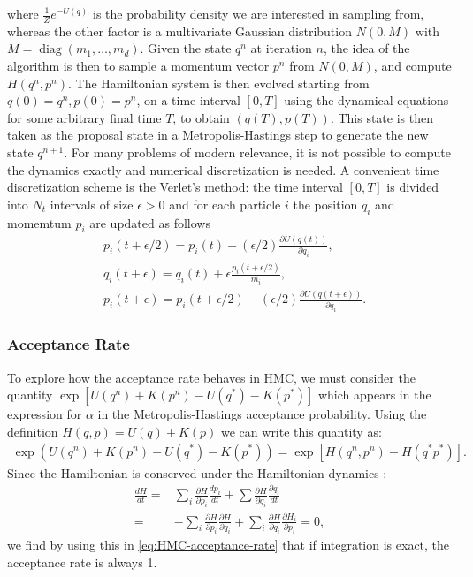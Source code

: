\documentclass[a4paper, 12pt,oneside]{article}
\begin{document}
			where $\frac{1}{Z} e^{-U(q)}$ is the probability density we are interested in sampling from, whereas the other factor is a multivariate Gaussian distribution $N(0, M)$ with $M=\operatorname{diag}\left(m_1, \ldots, m_d\right)$. Given the state $q^n$ at iteration $n$, the idea of the algorithm is then to sample a momentum vector $p^n$ from $N(0, M)$, and compute $H\left(q^n, p^n\right)$. The Hamiltonian system is then evolved starting from $q(0)=q^n, p(0)=p^n$, on a time interval $[0,T]$ using the dynamical equations for some arbitrary final time $T$, to obtain $(q(T), p(T))$. This state is then taken as the proposal state in a Metropolis-Hastings step to generate the new state $q^{n+1}$. For many problems of modern relevance, it is not possible to compute the dynamics exactly and numerical discretization is needed. A convenient time discretization scheme is the Verlet's method: the time interval $[0, T]$ is divided into $N_t$ intervals of size $\epsilon>0$ and for each particle $i$ the position $q_i$ and momemtum $p_i$ are updated as follows			
			\begin{align}
			& p_i(t+\epsilon / 2)=p_i(t)-(\epsilon / 2) \frac{\partial U(q(t))}{\partial q_i}, \\
			& q_i(t+\epsilon)=q_i(t)+\epsilon \frac{p_i(t+\epsilon / 2)}{m_i}, \\
			& p_i(t+\epsilon)=p_i(t+\epsilon / 2)-(\epsilon / 2) \frac{\partial U(q(t+\epsilon))}{\partial q_i}.
			\end{align}	
			\subsubsection{Acceptance Rate}
			To explore how the acceptance rate behaves in HMC, we must consider the quantity \newline $\exp \left[U\left(q^n\right)+K\left(p^n\right)-U\left(q^*\right)-K\left(p^*\right)\right]$ which appears in the expression for $\alpha$ in the Metropolis-Hastings acceptance probability. Using the definition $H(q, p)=U(q)+K(p)$ we can write this quantity as:
			\begin{gather}
				\exp \left(U\left(q^n\right)+K\left(p^n\right)-U\left(q^*\right)-K\left(p^*\right)\right) = \exp \left[H\left(q^n, p^n\right)-H\left(q^* p^*\right)\right].
				\label{eq:HMC-acceptance-rate} 
			\end{gather}
			Since the Hamiltonian is conserved under the Hamiltonian dynamics :
			\begin{align}
			\frac{d H}{d t}=&\sum_i \frac{\partial H}{\partial p_i} \frac{d p_i}{d t}+\sum \frac{\partial H}{\partial q_i} \frac{\partial q_i}{d t} \\
			=&-\sum_i \frac{\partial H}{\partial p_i} \frac{\partial H}{\partial q_i}+\sum_i \frac{\partial H}{\partial q_i} \frac{\partial H_i}{\partial p_i} = 0,
			\end{align}
			we find by using this in \ref{eq:HMC-acceptance-rate} that if integration is exact, the acceptance rate is always 1.
\end{document}
